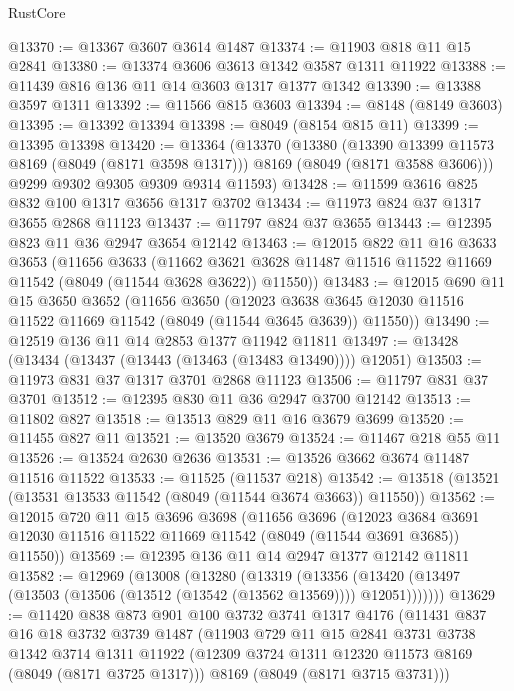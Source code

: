 \begin{lexlean}{RustCore}
\begin{coremodule}
@13370 := @13367 @3607 @3614 @1487
@13374 := @11903 @818 @11 @15 @2841
@13380 := @13374 @3606 @3613 @1342 @3587 @1311 @11922
@13388 := @11439 @816 @136 @11 @14 @3603 @1317 @1377 @1342
@13390 := @13388 @3597 @1311
@13392 := @11566 @815 @3603
@13394 := @8148 (@8149 @3603)
@13395 := @13392 @13394
@13398 := @8049 (@8154 @815 @11)
@13399 := @13395 @13398
@13420 := @13364
    (@13370
      (@13380
        (@13390 @13399 @11573 @8169 (@8049 (@8171 @3598 @1317)))
        @8169
        (@8049 (@8171 @3588 @3606)))
      @9299
      @9302
      @9305
      @9309
      @9314
      @11593)
@13428 := @11599 @3616 @825 @832 @100 @1317 @3656 @1317 @3702
@13434 := @11973 @824 @37 @1317 @3655 @2868 @11123
@13437 := @11797 @824 @37 @3655
@13443 := @12395 @823 @11 @36 @2947 @3654 @12142
@13463 := @12015
    @822
    @11
    @16
    @3633
    @3653
    (@11656
      @3633
      (@11662 @3621 @3628 @11487 @11516 @11522 @11669 @11542 (@8049 (@11544 @3628 @3622)) @11550))
@13483 := @12015
    @690
    @11
    @15
    @3650
    @3652
    (@11656
      @3650
      (@12023 @3638 @3645 @12030 @11516 @11522 @11669 @11542 (@8049 (@11544 @3645 @3639)) @11550))
@13490 := @12519 @136 @11 @14 @2853 @1377 @11942 @11811
@13497 := @13428 (@13434 (@13437 (@13443 (@13463 (@13483 @13490)))) @12051)
@13503 := @11973 @831 @37 @1317 @3701 @2868 @11123
@13506 := @11797 @831 @37 @3701
@13512 := @12395 @830 @11 @36 @2947 @3700 @12142
@13513 := @11802 @827
@13518 := @13513 @829 @11 @16 @3679 @3699
@13520 := @11455 @827 @11
@13521 := @13520 @3679
@13524 := @11467 @218 @55 @11
@13526 := @13524 @2630 @2636
@13531 := @13526 @3662 @3674 @11487 @11516 @11522
@13533 := @11525 (@11537 @218)
@13542 := @13518 (@13521 (@13531 @13533 @11542 (@8049 (@11544 @3674 @3663)) @11550))
@13562 := @12015
    @720
    @11
    @15
    @3696
    @3698
    (@11656
      @3696
      (@12023 @3684 @3691 @12030 @11516 @11522 @11669 @11542 (@8049 (@11544 @3691 @3685)) @11550))
@13569 := @12395 @136 @11 @14 @2947 @1377 @12142 @11811
@13582 := @12969
    (@13008
      (@13280
        (@13319
          (@13356 (@13420 (@13497 (@13503 (@13506 (@13512 (@13542 (@13562 @13569)))) @12051)))))))
@13629 := @11420
    @838
    @873
    @901
    @100
    @3732
    @3741
    @1317
    @4176
    (@11431
      @837
      @16
      @18
      @3732
      @3739
      @1487
      (@11903
        @729
        @11
        @15
        @2841
        @3731
        @3738
        @1342
        @3714
        @1311
        @11922
        (@12309 @3724 @1311 @12320 @11573 @8169 (@8049 (@8171 @3725 @1317)))
        @8169
        (@8049 (@8171 @3715 @3731)))

\end{coremodule}
\end{lexlean}
